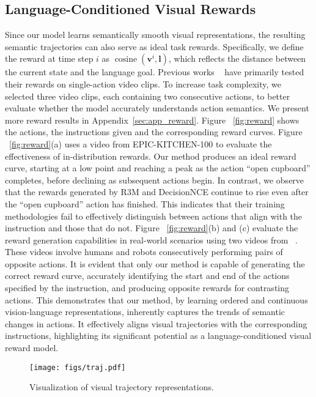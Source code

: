 \subsection{Language-Conditioned Visual Rewards}
Since our model learns semantically smooth visual representations, the resulting semantic trajectories can also serve as ideal task rewards. Specifically, we define the reward at time step $i$ as $\operatorname{cosine}(\mathbf{v}^i, \mathbf{l})$, which reflects the distance between the current state and the language goal. Previous works ~\cite{icml23-liv,icml24-decisionnce} have primarily tested their rewards on single-action video clips. To increase task complexity, we selected three video clips, each containing two consecutive actions, to better evaluate whether the model accurately understands action semantics. We present more reward results in Appendix~\ref{sec:app_reward}. Figure ~\ref{fig:reward} shows the actions, the instructions given and the corresponding reward curves. Figure ~\ref{fig:reward}(a) uses a video from EPIC-KITCHEN-100 to evaluate the effectiveness of in-distribution rewards. Our method produces an ideal reward curve, starting at a low point and reaching a peak as the action ``open cupboard'' completes, before declining as subsequent actions begin. In contrast, we observe that the rewards generated by R3M and DecisionNCE continue to rise even after the ``open cupboard'' action has finished. This indicates that their training methodologies fail to effectively distinguish between actions that align with the instruction and those that do not. Figure ~\ref{fig:reward}(b) and (c) evaluate the reward generation capabilities in real-world scenarios using two videos from ~\cite{rss22-robotvideo}. These videos involve humans and robots consecutively performing pairs of opposite actions. It is evident that only our method is capable of generating the correct reward curve, accurately identifying the start and end of the actions specified by the instruction, and producing opposite rewards for contrasting actions. This demonstrates that our method, by learning ordered and continuous vision-language representations, inherently captures the trends of semantic changes in actions. It effectively aligns visual trajectories with the corresponding instructions, highlighting its significant potential as a language-conditioned visual reward model.


\begin{figure}[t]
\begin{center}
\centerline{\texttt{[image: figs/traj.pdf]}}
\caption{Visualization of visual trajectory representations.}
\label{fig:traj}
\end{center}
\vskip -0.2in
\end{figure}


